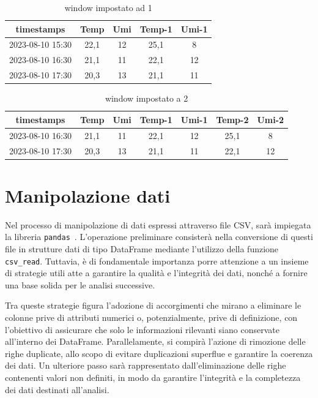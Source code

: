 \documentclass{rapportECL}
\begin{document}
\begin{table}[h]
  \centering
  \begin{tabular}{|*{5}{c|}}
  
  \hline
  timestamps & Temp & Umi & Temp-1 & Umi-1\\
  \hline
  2023-08-10 15:30 & 22,1 & 12 & 25,1 & 8\\
  \hline
  2023-08-10 16:30 & 21,1 & 11 & 22,1 & 12\\
  \hline
  2023-08-10 17:30 & 20,3 & 13 & 21,1 & 11\\
  \hline
  
  \end{tabular}
  
  \caption{window impostato ad 1}
\end{table}


\begin{table}[H]
  \centering
  \begin{tabular}{|*{7}{c|}}
  \hline
  timestamps & Temp & Umi & Temp-1 & Umi-1 & Temp-2 & Umi-2\\
  \hline
  2023-08-10 16:30 & 21,1 & 11 & 22,1 & 12 & 25,1 & 8\\
  \hline
  2023-08-10 17:30 & 20,3 & 13 & 21,1 & 11 & 22,1 & 12\\
  \hline
  
  \end{tabular}
  
  \caption{window impostato a 2}
\end{table}


\section{Manipolazione dati}
Nel processo di manipolazione di dati espressi attraverso file CSV, sarà impiegata la libreria  \texttt{pandas}~\cite{pandas}. L'operazione preliminare 
consisterà nella conversione di questi file in strutture dati di tipo DataFrame mediante l'utilizzo della funzione  \texttt{csv\_read}. 
Tuttavia, è di fondamentale importanza porre attenzione a un insieme di strategie utili atte a garantire la qualità e l'integrità dei dati, 
nonché a fornire una base solida per le analisi successive.

Tra queste strategie figura l'adozione di accorgimenti che mirano a eliminare le colonne prive di attributi numerici o, potenzialmente, 
prive di definizione, con l'obiettivo di assicurare che solo le informazioni rilevanti siano conservate all'interno dei DataFrame. 
Parallelamente, si compirà l'azione di rimozione delle righe duplicate, allo scopo di evitare duplicazioni superflue e garantire la coerenza dei dati. 
Un ulteriore passo sarà rappresentato dall'eliminazione delle righe contenenti valori non definiti, in modo da garantire l'integrità e la completezza 
dei dati destinati all'analisi.
\end{document}
